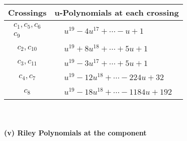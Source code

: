 \documentclass[1p]{elsarticle_modified}
\theoremstyle{definition}
\begin{document}
\begin{tabular}{m{50pt}|m{274pt}}
Crossings & \hspace{64pt}u-Polynomials at each crossing \\
\hline $$\begin{aligned}c_{1},c_{5},c_{6}\\c_{9}\end{aligned}$$&$\begin{aligned}
&u^{19}-4 u^{17}+\cdots- u+1
\end{aligned}$\\
\hline $$\begin{aligned}c_{2},c_{10}\end{aligned}$$&$\begin{aligned}
&u^{19}+8 u^{18}+\cdots+5 u+1
\end{aligned}$\\
\hline $$\begin{aligned}c_{3},c_{11}\end{aligned}$$&$\begin{aligned}
&u^{19}-3 u^{17}+\cdots+5 u+1
\end{aligned}$\\
\hline $$\begin{aligned}c_{4},c_{7}\end{aligned}$$&$\begin{aligned}
&u^{19}-12 u^{18}+\cdots-224 u+32
\end{aligned}$\\
\hline $$\begin{aligned}c_{8}\end{aligned}$$&$\begin{aligned}
&u^{19}-18 u^{18}+\cdots-1184 u+192
\end{aligned}$\\
\hline
\end{tabular}\\~\\
\newpage\renewcommand{\arraystretch}{1}
\flushleft \textbf{(v) Riley Polynomials at the component}\newline \\
\end{document}
